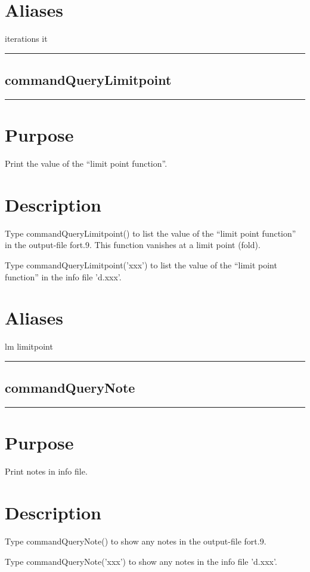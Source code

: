 \documentclass[12pt]{report}
\begin{document}
\begin{minipage}{6in}
    \section*{Aliases}
iterations it \medskip\hrule\end{minipage}\subsection{commandQueryLimitpoint} \label{sec:clui_ref_commandQueryLimitpoint}\begin{minipage}{6in}\hrule\medskip\section*{Purpose}
Print the value of the ``limit point function''.\section*{Description}

    Type commandQueryLimitpoint() to list the value of the ``limit point function'' 
    in the output-file fort.9. This function
    vanishes at a limit point (fold).

    Type commandQueryLimitpoint('xxx') to list the value of the ``limit point function'' 
    in the info file 'd.xxx'.
    \section*{Aliases}
lm limitpoint \medskip\hrule\end{minipage}\subsection{commandQueryNote} \label{sec:clui_ref_commandQueryNote}\begin{minipage}{6in}\hrule\medskip\section*{Purpose}
Print notes in info file.\section*{Description}

    Type commandQueryNote() to show any notes 
    in the output-file fort.9.

    Type commandQueryNote('xxx') to show any notes 
    in the info file 'd.xxx'.

\end{minipage}
\end{document}
